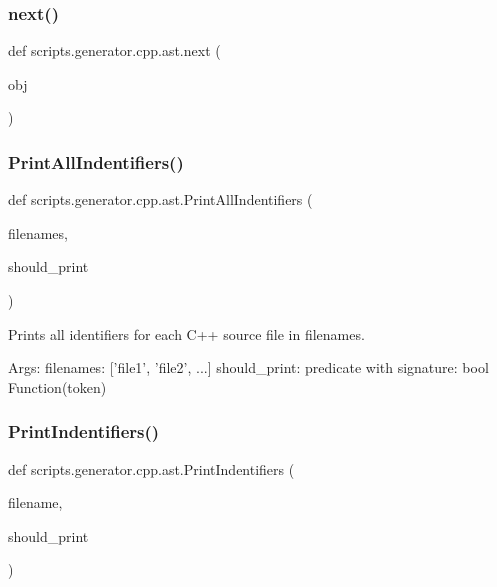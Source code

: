 \subsubsection{\texorpdfstring{next()}{next()}}
{\footnotesize\ttfamily def scripts.\+generator.\+cpp.\+ast.\+next (\begin{DoxyParamCaption}\item[{}]{obj }\end{DoxyParamCaption})}

\mbox{\label{namespacescripts_1_1generator_1_1cpp_1_1ast_a80e2ba421a8cd55d9bd9d19aef9242f8}} 
\subsubsection{\texorpdfstring{PrintAllIndentifiers()}{PrintAllIndentifiers()}}
{\footnotesize\ttfamily def scripts.\+generator.\+cpp.\+ast.\+Print\+All\+Indentifiers (\begin{DoxyParamCaption}\item[{}]{filenames,  }\item[{}]{should\+\_\+print }\end{DoxyParamCaption})}

\begin{DoxyVerb}Prints all identifiers for each C++ source file in filenames.

Args:
  filenames: ['file1', 'file2', ...]
  should_print: predicate with signature: bool Function(token)
\end{DoxyVerb}
 \mbox{\label{namespacescripts_1_1generator_1_1cpp_1_1ast_a5f0475dec5be82258e6ef13b8e81005f}} 
\subsubsection{\texorpdfstring{PrintIndentifiers()}{PrintIndentifiers()}}
{\footnotesize\ttfamily def scripts.\+generator.\+cpp.\+ast.\+Print\+Indentifiers (\begin{DoxyParamCaption}\item[{}]{filename,  }\item[{}]{should\+\_\+print }\end{DoxyParamCaption})}

